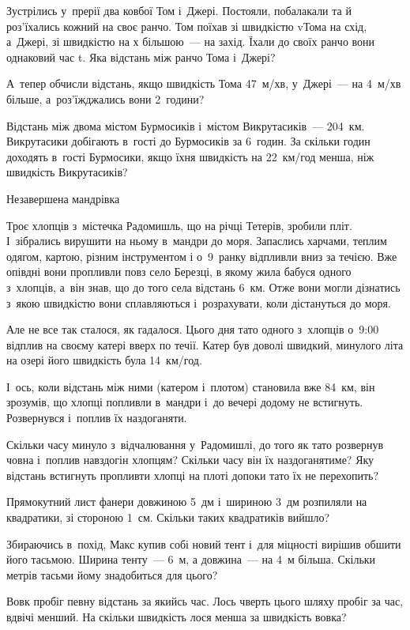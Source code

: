 \problem
Зустрілись у~прерії два ковбої Том і~Джері. Постояли, побалакали та й
роз’їхались кожний на своє ранчо. Том поїхав зі швидкістю vТома на схід,
а~Джері, зі швидкістю на х більшою~--- на захід. Їхали до своїх ранчо
вони однаковий час t. Яка відстань між ранчо Тома і~Джері?

А~тепер обчисли відстань, якщо швидкість Тома 47~м/хв,
у~Джері~--- на 4~м/хв більше, а~роз’їжджались вони 2~години?


\problem
Відстань між двома містом Бурмосиків і~містом Викрутасиків~--- 204~км.
Викрутасики добігають в~гості до Бурмосиків за 6~годин.
За скільки годин доходять в~гості Бурмосики,
якщо їхня швидкість на 22~км/год менша, ніж швидкість Викрутасиків?


\problem
Незавершена мандрівка

Троє хлопців з~містечка Радомишль, що на річці Тетерів, зробили пліт.
І~зібрались вирушити на ньому в~мандри до моря. Запаслись харчами,
теплим одягом, картою, різним інструментом і о~9~ранку відпливли вниз
за течією. Вже опівдні вони пропливли повз село Березці, в якому жила
бабуся одного з~хлопців, а~він знав, що до того села відстань 6~км.
Отже вони могли дізнатись з~якою швидкістю вони сплавляються
і~розрахувати, коли дістануться до моря.

Але не все так сталося, як гадалося. Цього дня тато одного з~хлопців
о~9:00 відплив на своєму катері вверх по течії. Катер був доволі швидкий,
минулого літа на озері його швидкість була 14~км/год.

І~ось, коли відстань між ними (катером і~плотом) становила вже 84~км,
він зрозумів, що хлопці попливли в~мандри і~до вечері додому не встигнуть.
Розвернувся і~поплив їх наздоганяти.

Скільки часу минуло з~відчалювання у~Радомишлі, до того як тато
розвернув човна і~поплив навздогін хлопцям?
Скільки часу він їх наздоганятиме?
Яку відстань встигнуть пропливти хлопці на плоті допоки тато їх не перехопить?


\problem
Прямокутний лист фанери довжиною 5~дм і~шириною 3~дм розпиляли на квадратики,
зі стороною 1~см.
Скільки таких квадратиків вийшло?


\problem
Збираючись в~похід, Макс купив собі новий тент і~для міцності вирішив
обшити його тасьмою. Ширина тенту~--- 6~м, а довжина~--- на 4~м більша.
Скільки метрів тасьми йому знадобиться для цього?


\problem
Вовк пробіг певну відстань за якийсь час.
Лось чверть цього шляху пробіг за час, вдвічі менший.
На скільки швидкість лося менша за швидкість вовка?



